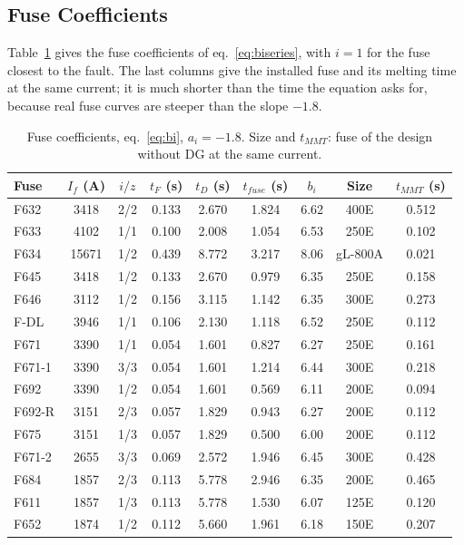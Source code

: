 \documentclass[12pt,a4paper]{article}
\begin{document}
\subsection{Fuse Coefficients}
Table~\ref{tab:t3} gives the fuse coefficients of eq.~\eqref{eq:biseries}, with $i = 1$ for the fuse closest
to the fault. The last columns give the installed fuse and its melting time at the same current; it is much
shorter than the time the equation asks for, because real fuse curves are steeper than the slope $-1.8$.

\begin{table}[H]
\centering\footnotesize
\begin{tabular}{|l|c|c|c|c|c|c|c|c|}
\hline
\textbf{Fuse} & \textbf{$I_f$ (A)} & \textbf{$i/z$} & \textbf{$t_F$ (s)} & \textbf{$t_D$ (s)} & \textbf{$t_{fuse}$ (s)} &
\textbf{$b_i$} & \textbf{Size} & \textbf{$t_{MMT}$ (s)} \\ \hline
F632 & 3418 & 2/2 & 0.133 & 2.670 & 1.824 & 6.62 & 400E & 0.512 \\ \hline
F633 & 4102 & 1/1 & 0.100 & 2.008 & 1.054 & 6.53 & 250E & 0.102 \\ \hline
F634 & 15671 & 1/2 & 0.439 & 8.772 & 3.217 & 8.06 & gL-800A & 0.021 \\ \hline
F645 & 3418 & 1/2 & 0.133 & 2.670 & 0.979 & 6.35 & 250E & 0.158 \\ \hline
F646 & 3112 & 1/2 & 0.156 & 3.115 & 1.142 & 6.35 & 300E & 0.273 \\ \hline
F-DL & 3946 & 1/1 & 0.106 & 2.130 & 1.118 & 6.52 & 250E & 0.112 \\ \hline
F671 & 3390 & 1/1 & 0.054 & 1.601 & 0.827 & 6.27 & 250E & 0.161 \\ \hline
F671-1 & 3390 & 3/3 & 0.054 & 1.601 & 1.214 & 6.44 & 300E & 0.218 \\ \hline
F692 & 3390 & 1/2 & 0.054 & 1.601 & 0.569 & 6.11 & 200E & 0.094 \\ \hline
F692-R & 3151 & 2/3 & 0.057 & 1.829 & 0.943 & 6.27 & 200E & 0.112 \\ \hline
F675 & 3151 & 1/3 & 0.057 & 1.829 & 0.500 & 6.00 & 200E & 0.112 \\ \hline
F671-2 & 2655 & 3/3 & 0.069 & 2.572 & 1.946 & 6.45 & 300E & 0.428 \\ \hline
F684 & 1857 & 2/3 & 0.113 & 5.778 & 2.946 & 6.35 & 200E & 0.465 \\ \hline
F611 & 1857 & 1/3 & 0.113 & 5.778 & 1.530 & 6.07 & 125E & 0.120 \\ \hline
F652 & 1874 & 1/2 & 0.112 & 5.660 & 1.961 & 6.18 & 150E & 0.207 \\ \hline
\end{tabular}
\caption{Fuse coefficients, eq.~\eqref{eq:bi}, $a_i=-1.8$. Size and $t_{MMT}$: fuse of the design without DG at the same
current.}
\label{tab:t3}
\end{table}
\end{document}
